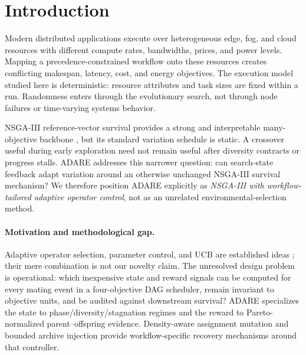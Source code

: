 \documentclass[preprint,12pt]{elsarticle}
\begin{document}
\section{Introduction}
\begin{sloppypar}
Modern distributed applications execute over heterogeneous edge, fog, and cloud resources with different compute rates, bandwidths, prices, and power levels. Mapping a precedence-constrained workflow onto these resources creates conflicting makespan, latency, cost, and energy objectives. The execution model studied here is deterministic: resource attributes and task sizes are fixed within a run. Randomness enters through the evolutionary search, not through node failures or time-varying systems behavior.
\end{sloppypar}

NSGA-III reference-vector survival provides a strong and interpretable many-objective backbone \cite{deb2014nsga3}, but its standard variation schedule is static. A crossover useful during early exploration need not remain useful after diversity contracts or progress stalls. ADARE addresses this narrower question: can search-state feedback adapt variation around an otherwise unchanged NSGA-III survival mechanism? We therefore position ADARE explicitly as \emph{NSGA-III with workflow-tailored adaptive operator control}, not as an unrelated environmental-selection method.

\paragraph{Motivation and methodological gap.}
Adaptive operator selection, parameter control, and UCB are established ideas \cite{auer2002ucb,dacosta2008aos,fialho2010aos,karafotias2015parameter}; their mere combination is not our novelty claim. The unresolved design problem is operational: which inexpensive state and reward signals can be computed for every mating event in a four-objective DAG scheduler, remain invariant to objective units, and be audited against downstream survival? ADARE specializes the state to phase/diversity/stagnation regimes and the reward to Pareto-normalized parent--offspring evidence. Density-aware assignment mutation and bounded archive injection provide workflow-specific recovery mechanisms around that controller.
\end{document}
